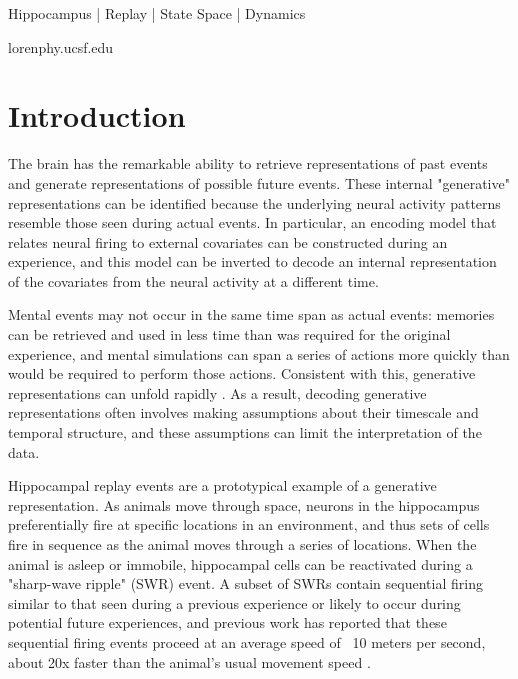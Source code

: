 \documentclass[times, twoside]{zHenriquesLab-StyleBioRxiv}
\begin{document}
\begin{keywords}
Hippocampus | Replay | State Space | Dynamics
\end{keywords}

\begin{corrauthor}
loren\at phy.ucsf.edu
\end{corrauthor}

\section*{Introduction}

The brain has the remarkable ability to retrieve representations of past events and generate representations of possible future events. These internal "generative" representations \cite{KayConstantSubsecondCycling2020} can be identified because the underlying neural activity patterns resemble those seen during actual events. In particular, an encoding model that relates neural firing to external covariates can be constructed during an experience, and this model can be inverted to decode an internal representation of the covariates from the neural activity at a different time.

Mental events may not occur in the same time span as actual events: memories can be retrieved and used in less time than was required for the original experience, and mental simulations can span a series of actions more quickly than would be required to perform those actions. Consistent with this, generative representations can unfold rapidly \cite{NadasdyReplayTimeCompression1999, LeeMemorySequentialExperience2002, DavidsonHippocampalReplayExtended2009, KarlssonAwakereplayremote2009}. As a result, decoding generative representations often involves making assumptions about their timescale and temporal structure, and these assumptions can limit the interpretation of the data.

Hippocampal replay events are a prototypical example of a generative representation. As animals move through space, neurons in the hippocampus preferentially fire at specific locations in an environment, and thus sets of cells fire in sequence as the animal moves through a series of locations. When the animal is asleep or immobile, hippocampal cells can be reactivated during a "sharp-wave ripple" (SWR) event. A subset of SWRs contain sequential firing similar to that seen during a previous experience or likely to occur during potential future experiences, and previous work has reported that these sequential firing events proceed at an average speed of ~10 meters per second, about 20x faster than the animal's usual movement speed \cite{NadasdyReplayTimeCompression1999, LeeMemorySequentialExperience2002, DavidsonHippocampalReplayExtended2009, KarlssonAwakereplayremote2009}. 
\end{document}
